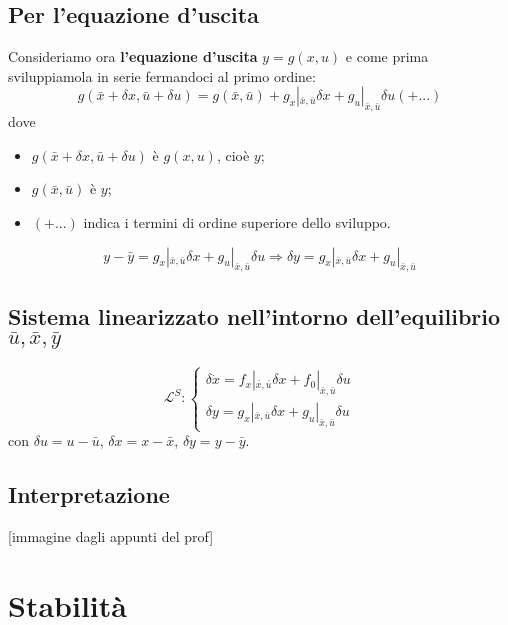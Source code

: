 \subsection{Per l'equazione d'uscita}
Consideriamo ora \textbf{l'equazione d'uscita} $y = g(x,u)$ e come prima sviluppiamola in serie fermandoci al primo ordine:
\[
    g(\bar{x} + \delta x , \bar{u} + \delta u) = g(\bar{x}, \bar{u}) + g_x|_{\bar{x}, \bar{u}} \delta x + g_u |_{\bar{x}, \bar{u}} \delta u (+ ...)
\]
dove
\begin{itemize}
    \item $g(\bar{x} + \delta x , \bar{u} + \delta u)$ è $g(x,u)$, cioè $y$;
    \item $g(\bar{x}, \bar{u})$ è $y$;
    \item $(+ ...)$ indica i termini di ordine superiore dello sviluppo.
\end{itemize}
\[
    y - \bar{y} = g_x|_{\bar{x}, \bar{u}} \delta x + g_u |_{\bar{x}, \bar{u}} \delta u \Longrightarrow \delta y = g_x|_{\bar{x}, \bar{u}} \delta x + g_u |_{\bar{x}, \bar{u}} 
\]
\subsection{Sistema linearizzato nell'intorno dell'equilibrio $\bar{u}, \bar{x}, \bar{y}$}
\[
    \mathcal{L}^S : \begin{cases}
        \delta \dot{x} = f_x |_{\bar{x},\bar{u}} \delta x + f_0|_{\bar{x},\bar{u}} \delta u\\
        \delta y = g_x|_{\bar{x},\bar{u}} \delta x + g_u |_{\bar{x},\bar{u}} \delta u
    \end{cases}
\]
con $ \delta u = u - \bar{u}$, $\delta x = x -\bar{x}$, $ \delta y = y - \bar{y}$.
\subsection{Interpretazione}
[immagine dagli appunti del prof]
\newpage
\section{Stabilità}
